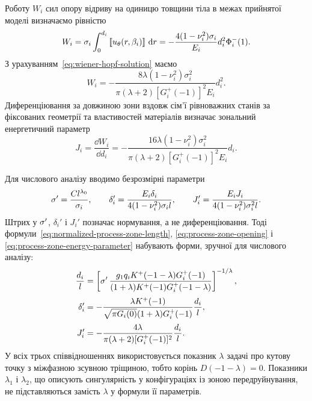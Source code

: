 Роботу $W_i$ сил опору відриву на одиницю товщини тіла в межах
прийнятої моделі визначаємо рівністю~\cite{Cherepanov1986}
\begin{equation*}
  W_i=\sigma_i\int_0^{d_i}
      \left[\!\left[u_\theta(r,\beta_i)\right]\!\right]\,\mathop{}\!\mathrm{d} r
  =-\frac{4(1-\nu_i^2)\sigma_i}{E_i}d_i^2\Phi_i^-(1).
\end{equation*}
З урахуванням~\eqref{eq:wiener-hopf-solution} маємо
\begin{equation*}
  W_i=-\frac{8\lambda(1-\nu_i^2)\sigma_i^2}
  {\pi(\lambda+2)[G_i^+(-1)]^2E_i}d_i^2.
\end{equation*}
Диференціювання за довжиною зони вздовж сім'ї рівноважних станів
за фіксованих геометрії та властивостей матеріалів визначає зональний
енергетичний параметр
\begin{equation}
\label{eq:process-zone-energy-parameter}
  J_i=\frac{\dd W_i}{\dd d_i}
  =-\frac{16\lambda(1-\nu_i^2)\sigma_i^2}
  {\pi(\lambda+2)[G_i^+(-1)]^2E_i}d_i.
\end{equation}

Для числового аналізу вводимо безрозмірні параметри
\begin{equation*}
  \sigma^{\prime}=\frac{Cl^{\lambda_0}}{\sigma_i},
  \qquad
  \delta_i'=\frac{E_i\delta_i}
  {4(1-\nu_i^2)\sigma_i l},
  \qquad
  J_i'=\frac{E_iJ_i}
  {4(1-\nu_i^2)\sigma_i^2l}.
\end{equation*}
Штрих у $\sigma^{\prime}$, $\delta_i'$ і $J_i'$ позначає нормування, а не
диференціювання. Тоді формули~\eqref{eq:normalized-process-zone-length},
\eqref{eq:process-zone-opening} і
\eqref{eq:process-zone-energy-parameter} набувають форми, зручної для
числового аналізу:
\begin{equation*}
\begin{aligned}
  \frac{d_i}{l}
    &=\left[
      \sigma^{\prime}\,
      \frac{g_1q_iK^+(-1-\lambda)G_i^+(-1)}
      {(1+\lambda)K^+(-1)G_i^+(-1-\lambda)}
    \right]^{-1/\lambda},\\[2pt]
  \delta_i'
    &=-\frac{\lambda K^+(-1)}
      {\sqrt{\pi G_i(0)}(1+\lambda)G_i^+(-1)}
      \frac{d_i}{l},\\[2pt]
  J_i'
    &=-\frac{4\lambda}
      {\pi(\lambda+2)[G_i^+(-1)]^2}
      \frac{d_i}{l}.
\end{aligned}
\end{equation*}
У всіх трьох співвідношеннях використовується показник $\lambda$ задачі
про кутову точку з міжфазною зсувною тріщиною, тобто корінь
$D(-1-\lambda)=0$. Показники $\lambda_1$ і $\lambda_2$, що описують сингулярність у
конфігураціях із зоною передруйнування, не підставляються замість
$\lambda$ у формули її параметрів.

